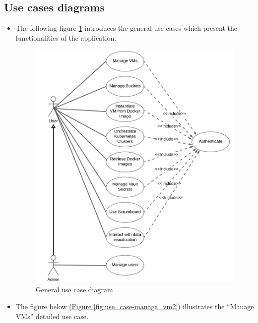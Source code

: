\subsection{Use cases diagrams}
\begin{itemize}

    \item The following figure  \hyperref[fig:general_use_cases]{\ref{fig:general_use_cases}} introduces the general use cases which present the
functionalities of the application.

\begin{figure}[htbp]
  \center
  \includegraphics[width=19cm]{general_use_cases}
  \caption{General use case diagram}
  \label{fig:general_use_cases}
\end{figure}
\vspace{170mm}
\item The figure below (\hyperref[fig:use_case-manage_vm2]{Figure \ref{fig:use_case-manage_vm2}}) illustrates the ``Manage VMs'' detailed use case.
\vspace{-0.2in}
\begin{center}
\begin{figure}[h]

\end{figure}
\end{center}
\end{itemize}
